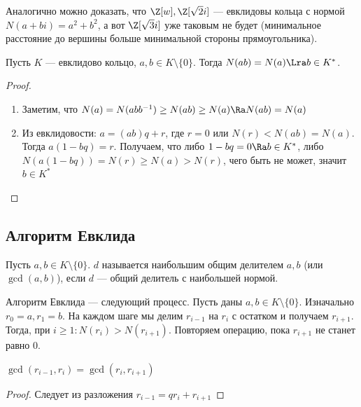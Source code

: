 \begin{note}
    Аналогично можно доказать, что \(\Z[w], \Z[\sqrt{2}i]\) --- евклидовы кольца с нормой \(N(a + bi) = a^2 + b^2\), а вот \(\Z[\sqrt{3}i]\) уже таковым не будет (минимальное расстояние до вершины больше минимальной стороны прямоугольника).
\end{note}

\begin{lemma}
    Пусть \(K\) --- евклидово кольцо, \(a, b \in K \setminus \{0\}\). Тогда \(N(ab) = N(a) \Lra b \in K^*\).
\end{lemma}
\begin{proof}\indent
    \begin{enumerate}
        \item[\(\La\)] Заметим, что \(N(a) = N(abb^{-1}) \ge N(ab) \ge N(a) \Ra N(ab) = N(a)\)
        \item[\(\Ra\)] Из евклидовости: \(a = (ab)q + r\), где \(r = 0\) или \(N(r) < N(ab) = N(a)\). Тогда \(a(1 - bq) = r\). Получаем, что либо \(1 - bq = 0 \Ra b \in K^*\), либо \(N(a(1 - bq)) = N(r) \ge N(a) > N(r)\), чего быть не может, значит \(b \in K^*\)
    \end{enumerate}
\end{proof}

\subsection{Алгоритм Евклида}

\begin{definition}
    Пусть \(a, b \in K \setminus \{0\}\). \(d\) называется наибольшим общим делителем \(a, b\) (или \(\gcd(a, b)\)), если \(d\) --- общий делитель с наибольшей нормой.
\end{definition}

\begin{definition}
    Алгоритм Евклида --- следующий процесс. Пусть даны \(a, b \in K \setminus \{0\}\). Изначально \(r_0 = a, r_1 = b\). На каждом шаге мы делим \(r_{i - 1}\) на \(r_i\) с остатком и получаем \(r_{i + 1}\). Тогда, при \(i \ge 1: N(r_i) > N(r_{i + 1})\). Повторяем операцию, пока \(r_{i + 1}\) не станет равно 0.
\end{definition}

\begin{note}
    \(\gcd(r_{i - 1}, r_i) = \gcd(r_i, r_{i + 1})\)
\end{note}
\begin{proof}
    Следует из разложения \(r_{i - 1} = qr_i + r_{i + 1}\)
\end{proof}

